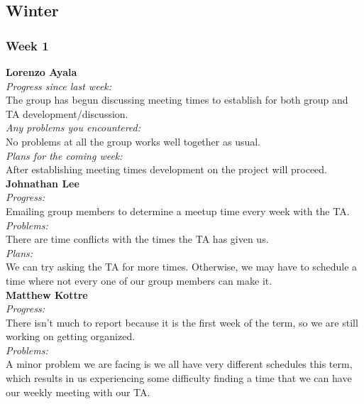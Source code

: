 \subsection{Winter}
\subsubsection{Week 1}

\textbf{Lorenzo Ayala}\\
\noindent\textit{Progress since last week:}\\
The group has begun discussing meeting times to establish for both group and TA development/discussion.\\

\noindent\textit{Any problems you encountered:}\\
\noindent  No problems at all the group works well together as usual.\\

\noindent\textit{Plans for the coming week:}\\
\noindent After establishing meeting times development on the project will proceed.\\

\noindent\textbf{Johnathan Lee}\\
\noindent\textit{Progress:}\\
Emailing group members to determine a meetup time every week with the TA. \\ 

\noindent\textit{Problems:}\\
\noindent There are time conflicts with the times the TA has given us.\\

\noindent\textit{Plans:}\\
\noindent We can try asking the TA for more times. Otherwise, we may have to schedule a time where not every one of our group members can make it.\\

\noindent\textbf{Matthew Kottre}\\
\noindent\textit{Progress:}\\
There isn't much to report because it is the first week of the term, so we are still working on getting organized.\\

\noindent\textit{Problems:}\\
\noindent A minor problem we are facing is we all have very different schedules this term, which results in us experiencing some difficulty finding a time that we can have our weekly meeting with our TA.\\

